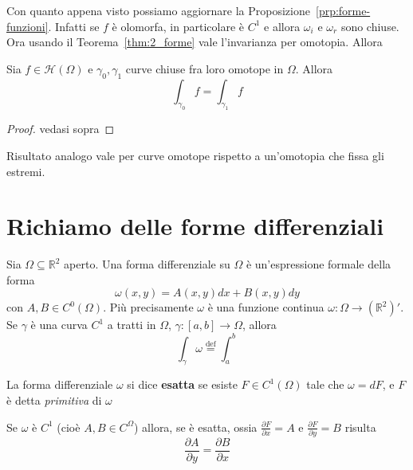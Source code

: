 Con quanto appena visto possiamo aggiornare la
Proposizione~\ref{prp:forme-funzioni}. Infatti se \(f\) è olomorfa, in
particolare è \(C^{1}\) e allora \(\omega_{i}\) e \(\omega_{r}\) sono chiuse.
Ora usando il Teorema~\ref{thm:2_forme} vale l'invarianza per omotopia. Allora
\begin{theorem}
    Sia \(f \in \mathcal{H}{(\Omega)}\) e \(\gamma_{0}, \gamma_{1}\) curve
    chiuse fra loro omotope in \(\Omega\). Allora
    \[
        \int_{\gamma_{0}} f = \int_{\gamma_{1}} f
    \]
\end{theorem}
\begin{proof}
    vedasi sopra
\end{proof}
Risultato analogo vale per curve omotope rispetto a un'omotopia che fissa gli
estremi.


\newpage
\section{Richiamo delle forme differenziali}

Sia \(\Omega \subseteq \mathbb{R}^{2} \) aperto. Una forma differenziale su \(\Omega\) è
un'espressione formale della forma 
\[
    \omega(x, y) = A(x,y)dx + B(x,y) dy
\]
con \(A, B \in C^{0}(\Omega)\). Più precisamente \(\omega\) è una funzione
continua \(\omega: \Omega \to (\mathbb{R}^{2})'\). Se \(\gamma\) è una curva
\(C^{1}\) a tratti in \(\Omega\), \(\gamma : [a,b] \to \Omega\), allora
\[
    \int_{\gamma}\omega \overset{\text{def}}{=} \int_{a}^{b} 
\]
\begin{definition}
    La forma differenziale \(\omega\) si dice \textbf{esatta} se esiste \(F \in
    C^{1}(\Omega)\) tale che \(\omega = dF\), e \(F\) è detta \emph{primitiva}
    di \(\omega\) 
\end{definition}

Se \(\omega\) è \(C^{1}\) (cioè \(A, B \in C^{\Omega}\)) allora, se è esatta,
ossia \(\frac{\partial F}{\partial x} = A\) e \(\frac{\partial F}{\partial y} =
B\) risulta
\begin{equation}\label{eq:forma-chiusa}
    \frac{\partial A}{\partial y} = \frac{\partial B}{\partial x}
\end{equation}

